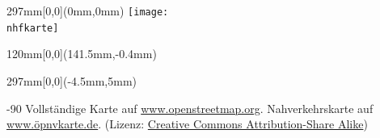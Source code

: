 \documentclass[a4paper]{memoir}
\begin{document}
\pagestyle{empty}



\null
\newpage

\impressum{\redaktionsschluss}
\null
\newpage

\pagestyle{empty}

\begin{textblock*}{297mm}[0,0](0mm,0mm)
    \texttt{[image: \\nhfkarte]}
\end{textblock*}


\begin{textblock*}{120mm}[0,0](141.5mm,-0.4mm)
    \setlength\fboxsep{0pt}
    \setlength\fboxrule{0.4mm}
\end{textblock*}


\begin{textblock*}{297mm}[0,0](-4.5mm,5mm)
    \begin{turn}{-90}
        Vollständige Karte auf \url{www.openstreetmap.org}.
        Nahverkehrskarte auf \url{www.öpnvkarte.de}.
        (Lizenz: \href{http://creativecommons.org/licenses/by-sa/2.0/}{Creative Commons Attribution-Share Alike})
    \end{turn}
\end{textblock*}
\null
\newpage
\end{document}
